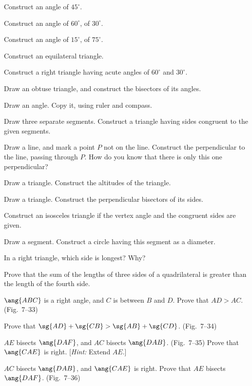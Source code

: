 \documentclass[11pt]{book}
\theoremstyle{bkplain}
\theoremstyle{XIplainnote}
\theoremstyle{bkplain}
\theoremstyle{bkplain}
\begin{document}
\begin{exlist}
\item Construct an angle of $45^\circ$.
\item Construct an angle of $60^\circ$, of $30^\circ$.
\item Construct an angle of $15^\circ$, of $75^\circ$.
\item Construct an equilateral triangle.
\item Construct a right triangle having acute angles of $60^\circ$ and
  $30^\circ$.
\item Draw an obtuse triangle, and construct the bisectors of its angles.
\item Draw an angle. Copy it, using ruler and compass.
\item Draw three separate segments. Construct a triangle having sides congruent
  to the given segments.
\item Draw a line, and mark a point $P$ not on the line. Construct the
  perpendicular to the line, passing through $P$. How do you know that there is
  only this one perpendicular?
\item Draw a triangle. Construct the altitudes of the triangle.
\item Draw a triangle. Construct the perpendicular bisectors of its sides.
\item Construct an isosceles triangle if the vertex angle and the congruent
  sides are given.
\item Draw a segment. Construct a circle having this segment as a diameter.
\item In a right triangle, which side is longest? Why?
\item Prove that the sum of the lengths of three sides of a quadrilateral is
  greater than the length of the fourth side.
\item $\ang{ABC}$ is a right angle, and $C$ is between $B$ and $D$. Prove that
  $AD > AC$. (Fig.~7--33)
\exfig{\FIGVIITHIRTYTHREE}
\item Prove that $\sg{AD} + \sg{CB} > \sg{AB} + \sg{CD}$. (Fig.~7--34)
\exfig{\FIGVIITHIRTYFOUR}
\item $AE$ bisects $\ang{DAF}$, and $AC$ bisects $\ang{DAB}$. (Fig.~7--35)
  Prove that $\ang{CAE}$ is right. [\emph{Hint:} Extend $AE$.]
\exfig{\FIGVIITHIRTYFIVE}
\item $AC$ bisects $\ang{DAB}$, and $\ang{CAE}$ is right. Prove that $AE$
  bisects $\ang{DAF}$. (Fig.~7--36)
\exfig{\FIGVIITHIRTYSIX}
\end{exlist}
\end{document}
